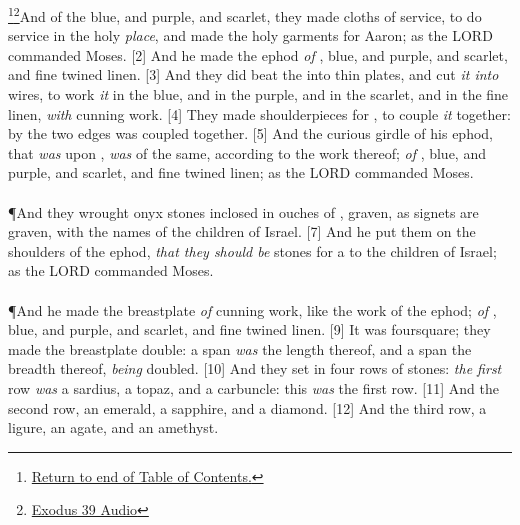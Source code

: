 \footnote{\textcolor[cmyk]{0.99998,1,0,0}{\hyperlink{TOC}{Return to end of Table of Contents.}}}\footnote{\href{https://audiobible.com/bible/exodus_39.html}{\textcolor[cmyk]{0.99998,1,0,0}{Exodus 39 Audio}}}\textcolor[cmyk]{0.99998,1,0,0}{And of the blue, and purple, and scarlet, they made cloths of service, to do service in the holy \emph{place}, and made the holy garments for Aaron; as the LORD commanded Moses.}
[2] \textcolor[cmyk]{0.99998,1,0,0}{And he made the ephod \emph{of} , blue, and purple, and scarlet, and fine twined linen.}
[3] \textcolor[cmyk]{0.99998,1,0,0}{And they did beat the  into thin plates, and cut \emph{it into} wires, to work \emph{it} in the blue, and in the purple, and in the scarlet, and in the fine linen, \emph{with} cunning work.}
[4] \textcolor[cmyk]{0.99998,1,0,0}{They made shoulderpieces for , to couple \emph{it} together: by the two edges was  coupled together.}
[5] \textcolor[cmyk]{0.99998,1,0,0}{And the curious girdle of his ephod, that \emph{was} upon , \emph{was} of the same, according to the work thereof; \emph{of} , blue, and purple, and scarlet, and fine twined linen; as the LORD commanded Moses.}\\
\\
\P \textcolor[cmyk]{0.99998,1,0,0}{And they wrought onyx stones inclosed in ouches of , graven, as signets are graven, with the names of the children of Israel.}
[7] \textcolor[cmyk]{0.99998,1,0,0}{And he put them on the shoulders of the ephod, \emph{that they should be} stones for a  to the children of Israel; as the LORD commanded Moses.}\\
\\
\P \textcolor[cmyk]{0.99998,1,0,0}{And he made the breastplate \emph{of} cunning work, like the work of the ephod; \emph{of} , blue, and purple, and scarlet, and fine twined linen.}
[9] \textcolor[cmyk]{0.99998,1,0,0}{It was foursquare; they made the breastplate double: a span \emph{was} the length thereof, and a span the breadth thereof, \emph{being} doubled.}
[10] \textcolor[cmyk]{0.99998,1,0,0}{And they set in  four rows of stones: \emph{the first} row \emph{was} a sardius, a topaz, and a carbuncle: this \emph{was} the first row.}
[11] \textcolor[cmyk]{0.99998,1,0,0}{And the second row, an emerald, a sapphire, and a diamond.}
[12] \textcolor[cmyk]{0.99998,1,0,0}{And the third row, a ligure, an agate, and an amethyst.}
